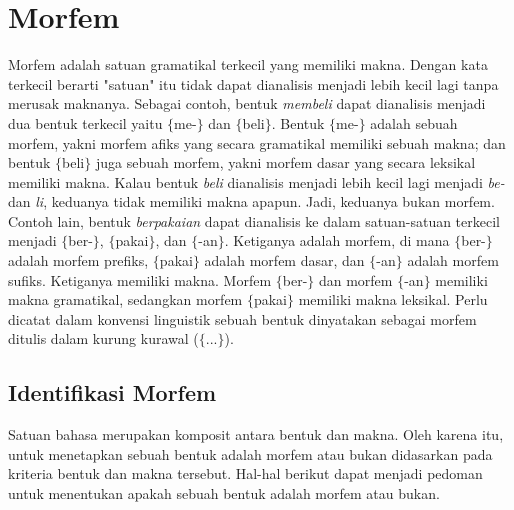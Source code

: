 

\section{Morfem}
\label{sec:morfem}

Morfem adalah satuan gramatikal terkecil yang memiliki makna\cite{chaer:08:morfologi}. Dengan kata terkecil berarti "satuan" itu tidak dapat dianalisis menjadi lebih kecil lagi tanpa merusak maknanya. Sebagai contoh, bentuk \textit{membeli} dapat dianalisis menjadi dua bentuk terkecil yaitu $\lbrace$me-$\rbrace$ dan $\lbrace$beli$\rbrace$. Bentuk $\lbrace$me-$\rbrace$ adalah sebuah morfem, yakni morfem afiks yang secara gramatikal memiliki sebuah makna; dan bentuk $\lbrace$beli$\rbrace$ juga sebuah morfem, yakni morfem dasar yang secara leksikal memiliki makna. Kalau bentuk \textit{beli} dianalisis menjadi lebih kecil lagi menjadi \textit{be-} dan \textit{li}, keduanya tidak memiliki makna apapun. Jadi, keduanya bukan morfem. Contoh lain, bentuk \textit{berpakaian} dapat dianalisis ke dalam satuan-satuan terkecil menjadi $\lbrace$ber-$\rbrace$, $\lbrace$pakai$\rbrace$, dan $\lbrace$-an$\rbrace$. Ketiganya adalah morfem, di mana $\lbrace$ber-$\rbrace$ adalah morfem prefiks, $\lbrace$pakai$\rbrace$ adalah morfem dasar, dan $\lbrace$-an$\rbrace$ adalah morfem sufiks. Ketiganya memiliki makna. Morfem $\lbrace$ber-$\rbrace$ dan morfem $\lbrace$-an$\rbrace$ memiliki makna gramatikal, sedangkan morfem $\lbrace$pakai$\rbrace$ memiliki makna leksikal. Perlu dicatat dalam konvensi linguistik sebuah bentuk dinyatakan sebagai morfem ditulis dalam kurung kurawal ($\lbrace$...$\rbrace$).


\subsection{Identifikasi Morfem}
\label{sec:identifikasiMorfem}

Satuan bahasa merupakan komposit antara bentuk dan makna\cite{chaer:08:morfologi}. Oleh karena itu, untuk menetapkan sebuah bentuk adalah morfem atau bukan didasarkan pada kriteria bentuk dan makna tersebut. Hal-hal berikut dapat menjadi pedoman untuk menentukan apakah sebuah bentuk adalah morfem atau bukan. 

